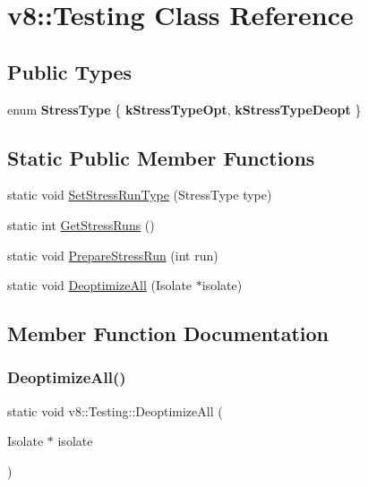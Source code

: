 \hypertarget{classv8_1_1Testing}{}\section{v8\+:\+:Testing Class Reference}
\label{classv8_1_1Testing}
\subsection*{Public Types}
\begin{DoxyCompactItemize}
\item 
\mbox{\label{classv8_1_1Testing_a436a1a521a0bc070cc0b46ad7a658575}} 
enum {\bfseries Stress\+Type} \{ {\bfseries k\+Stress\+Type\+Opt}, 
{\bfseries k\+Stress\+Type\+Deopt}
 \}
\end{DoxyCompactItemize}
\subsection*{Static Public Member Functions}
\begin{DoxyCompactItemize}
\item 
static void \mbox{\hyperlink{classv8_1_1Testing_aafa5a4917998aa64134aa750ce5c4b2e}{Set\+Stress\+Run\+Type}} (Stress\+Type type)
\item 
static int \mbox{\hyperlink{classv8_1_1Testing_adc876063b1e07462b8d9544dd8efab36}{Get\+Stress\+Runs}} ()
\item 
static void \mbox{\hyperlink{classv8_1_1Testing_ab9da044b18b9d05770b655bed27ed7f4}{Prepare\+Stress\+Run}} (int run)
\item 
static void \mbox{\hyperlink{classv8_1_1Testing_ac0881a3cee2f8f91039d3ecdb15dbf27}{Deoptimize\+All}} (Isolate $\ast$isolate)
\end{DoxyCompactItemize}


\subsection{Member Function Documentation}
\mbox{\label{classv8_1_1Testing_ac0881a3cee2f8f91039d3ecdb15dbf27}} 
\subsubsection{\texorpdfstring{Deoptimize\+All()}{DeoptimizeAll()}}
{\footnotesize\ttfamily static void v8\+::\+Testing\+::\+Deoptimize\+All (\begin{DoxyParamCaption}\item[{Isolate $\ast$}]{isolate }\end{DoxyParamCaption})\hspace{0.3cm}{\ttfamily [static]}}

